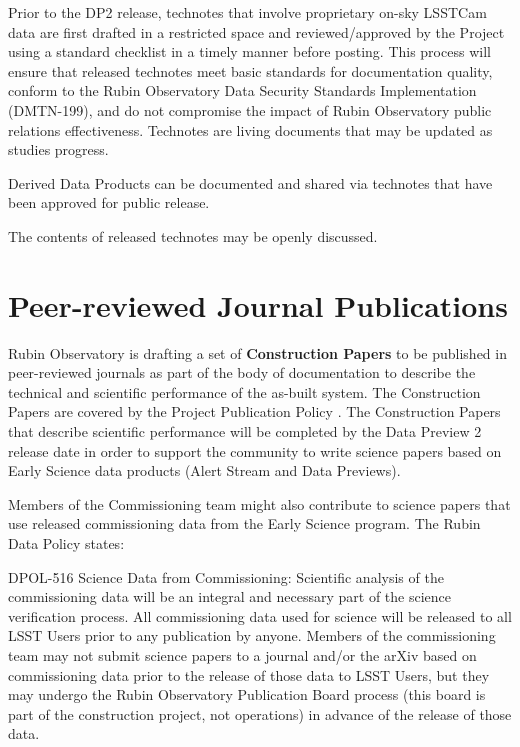 \documentclass[SE,authoryear,toc,lsstdraft]{lsstdoc}
\begin{document}
Prior to the DP2 release, technotes that involve proprietary on-sky LSSTCam data are first drafted in a restricted space and reviewed/approved by the Project using a standard checklist in a timely manner before posting.
This process will ensure that released technotes meet basic standards for documentation quality, conform to the Rubin Observatory Data Security Standards Implementation (DMTN-199), and do not compromise the impact of Rubin Observatory public relations effectiveness.
Technotes are living documents that may be updated as studies progress.

Derived Data Products can be documented and shared via technotes that have been approved for public release.

The contents of released technotes may be openly discussed.

\section{Peer-reviewed Journal Publications}

Rubin Observatory is drafting a set of \textbf{Construction Papers} to be published in peer-reviewed journals as part of the body of documentation to describe the technical and scientific performance of the as-built system.
The Construction Papers are covered by the Project Publication Policy .
The Construction Papers that describe scientific performance will be completed by the Data Preview 2 release date in order to support the community to write science papers based on Early Science data products (Alert Stream and Data Previews).

Members of the Commissioning team might also contribute to science papers that use released commissioning data from the Early Science program. The Rubin Data Policy  states:

\begin{emph}
  DPOL-516 Science Data from Commissioning: Scientific analysis of the commissioning data will be an integral and necessary part of the science verification process.
  All commissioning data used for science will be released to all LSST Users prior to any publication by anyone.
  Members of the commissioning team may not submit science papers to a journal and/or the arXiv based on commissioning data prior to the release of those data to LSST Users, but they may undergo the Rubin Observatory Publication Board process (this board is part of the construction project, not operations) in advance of the release of those data.
\end{emph}
\end{document}
